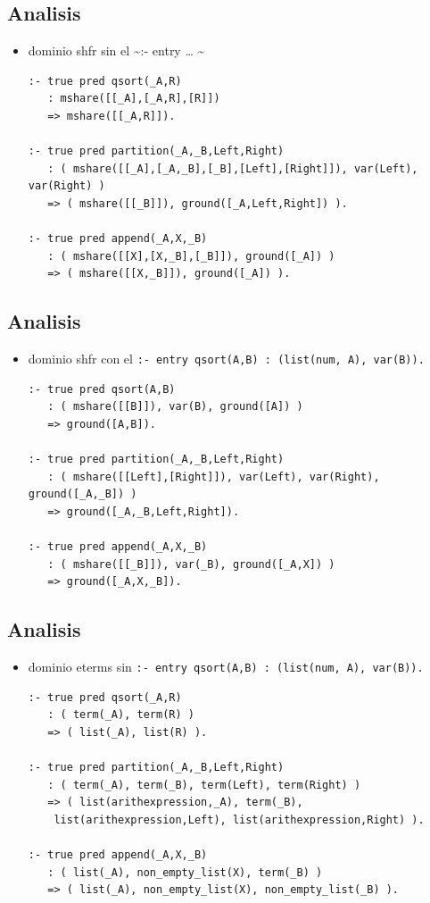 \documentclass[11pt]{article}
\begin{document}
\subsection*{Analisis}
\label{sec:org11ee096}
\begin{itemize}
\item dominio shfr sin el \textasciitilde{}:- entry \ldots{} \textasciitilde{} 
\begin{verbatim}
:- true pred qsort(_A,R)
   : mshare([[_A],[_A,R],[R]])
   => mshare([[_A,R]]).

:- true pred partition(_A,_B,Left,Right)
   : ( mshare([[_A],[_A,_B],[_B],[Left],[Right]]), var(Left), var(Right) )
   => ( mshare([[_B]]), ground([_A,Left,Right]) ).

:- true pred append(_A,X,_B)
   : ( mshare([[X],[X,_B],[_B]]), ground([_A]) )
   => ( mshare([[X,_B]]), ground([_A]) ).
\end{verbatim}
\end{itemize}

\subsection*{Analisis}
\label{sec:orgd4d1a4d}
\begin{itemize}
\item dominio shfr con el \texttt{:- entry qsort(A,B) : (list(num, A), var(B)).} 
\begin{verbatim}
:- true pred qsort(A,B)
   : ( mshare([[B]]), var(B), ground([A]) )
   => ground([A,B]).

:- true pred partition(_A,_B,Left,Right)
   : ( mshare([[Left],[Right]]), var(Left), var(Right), ground([_A,_B]) )
   => ground([_A,_B,Left,Right]).

:- true pred append(_A,X,_B)
   : ( mshare([[_B]]), var(_B), ground([_A,X]) )
   => ground([_A,X,_B]).
\end{verbatim}
\end{itemize}

\subsection*{Analisis}
\label{sec:org69f0cbe}
\begin{itemize}
\item dominio eterms sin  \texttt{:- entry qsort(A,B) : (list(num, A), var(B)).} 
\begin{verbatim}
:- true pred qsort(_A,R)
   : ( term(_A), term(R) )
   => ( list(_A), list(R) ).

:- true pred partition(_A,_B,Left,Right)
   : ( term(_A), term(_B), term(Left), term(Right) )
   => ( list(arithexpression,_A), term(_B), 
	list(arithexpression,Left), list(arithexpression,Right) ).

:- true pred append(_A,X,_B)
   : ( list(_A), non_empty_list(X), term(_B) )
   => ( list(_A), non_empty_list(X), non_empty_list(_B) ).
\end{verbatim}
\end{itemize}
\end{document}
